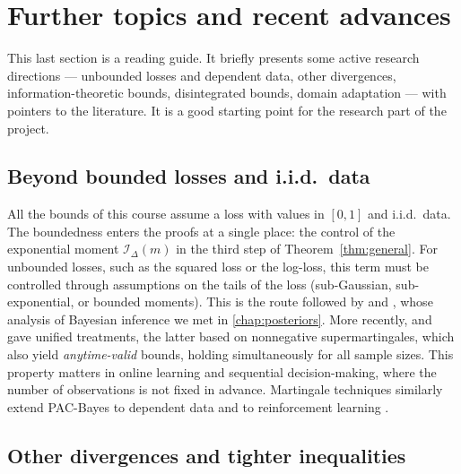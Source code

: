 \section{Further topics and recent advances}
\label{chap:advances}

\begin{objectives}
This last section is a reading guide. It briefly presents some active research
directions --- unbounded losses and dependent data, other divergences,
information-theoretic bounds, disintegrated bounds, domain adaptation --- with
pointers to the literature. It is a good starting point for the research part of
the project.
\end{objectives}

\subsection{Beyond bounded losses and i.i.d.\ data}

All the bounds of this course assume a loss with values in $[0,1]$ and i.i.d.\
data. The boundedness enters the proofs at a single place: the control of the
exponential moment $\mathcal I_\Delta(m)$ in the third step of
Theorem~\ref{thm:general}. For unbounded losses, such as the squared loss or the
log-loss, this term must be controlled through assumptions on the tails of the
loss (sub-Gaussian, sub-exponential, or bounded moments). This is the route
followed by \citet{alquier2016properties} and \citet{germain2016pac}, whose
analysis of Bayesian inference we met in \cref{chap:posteriors}. More recently,
\citet{rodriguez2024more} and \citet{chugg2023unified} gave unified treatments,
the latter based on nonnegative supermartingales, which also yield
\emph{anytime-valid} bounds, holding simultaneously for all sample sizes. This property matters in online learning and
sequential decision-making, where the number of observations is not fixed in
advance. Martingale techniques similarly extend PAC-Bayes to dependent data and
to reinforcement learning \citep{seldin2012pac,chugg2023unified}.

\subsection{Other divergences and tighter inequalities}


